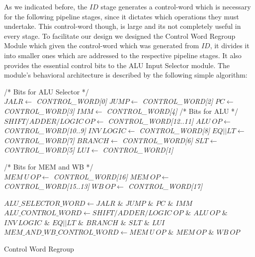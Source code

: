 As we indicated before, the $ID$ stage generates a control-word which is necessary for the following pipeline stages, since it dictates which operations they must undertake. This control-word though, is large and its not completely useful in every stage. To facilitate our design we designed the Control Word Regroup Module which given the control-word which was generated from $ID$, it divides it into smaller ones which are addressed to the respective pipeline stages. It also provides the essential control bits to the ALU Input Selector module. The module's behavioral architecture is described by the following simple algorithm:\\


\begin{algorithm}[H]
	\SetAlgoLined
	
{\footnotesize 	\BlankLine
	\BlankLine
	/* Bits for ALU Selector */ \\
	\emph{$JALR \leftarrow $ CONTROL\_WORD[0]}\;
	\emph{$JUMP \leftarrow $ CONTROL\_WORD[2]}\; 
	\emph{$PC   \leftarrow $ CONTROL\_WORD[3]}\; 
	\emph{$IMM  \leftarrow $ CONTROL\_WORD[4]}\; 
	\BlankLine
	/* Bits for ALU */ \\
	\emph{$SHIFT/ADDER/LOGIC \ OP \leftarrow $ CONTROL\_WORD[12..11]}\;
	\emph{$ALU \  OP 		 		\leftarrow $ CONTROL\_WORD[10..9]}\;
	\emph{$INV \ LOGIC 			\leftarrow $ CONTROL\_WORD[8]}\;
	\emph{$EQ||LT				\leftarrow $ CONTROL\_WORD[7]}\;
	\emph{$BRANCH		 	 	\leftarrow $ CONTROL\_WORD[6]}\;
	\emph{$SLT			 	 	\leftarrow $ CONTROL\_WORD[5]}\;
	\emph{$LUI		 	 		\leftarrow $ CONTROL\_WORD[1]}\;
		
	\BlankLine
	/* Bits for MEM and WB */ \\
	\emph{$MEM \ U \ OP	 	 		\leftarrow $ CONTROL\_WORD[16]}\;
	\emph{$MEM \ OP 				\leftarrow $ CONTROL\_WORD[15..13]}\;
	\emph{$WB \ OP				\leftarrow $ CONTROL\_WORD[17]}\;
	\BlankLine}
	\BlankLine
	
{\footnotesize 	\emph{{\footnotesize $ALU\_SELECTOR\_WORD\leftarrow JALR$ $\&$ $JUMP$ $\&$ $PC$ $\&$ $IMM$}}\;
	\emph{{\footnotesize $ALU\_CONTROL\_WORD  \leftarrow SHIFT/ADDER/LOGIC \ OP$ $\&$ $ALU \ OP$ $\&$ $INV \ LOGIC$ $\&$ $EQ||LT$ $\&$ $BRANCH$ $\&$ $SLT$ $\&$ $LUI$}}\;
	\emph{{\footnotesize $MEM\_AND\_WB\_CONTROL\_WORD \leftarrow MEM \ U \ OP$ $\&$ $MEM \ OP $ $\&$ $WB \ OP$}}\;
	\caption{Control Word Regroup}}
	\label{Algorithm5}
\end{algorithm}	
\vspace{2mm}

